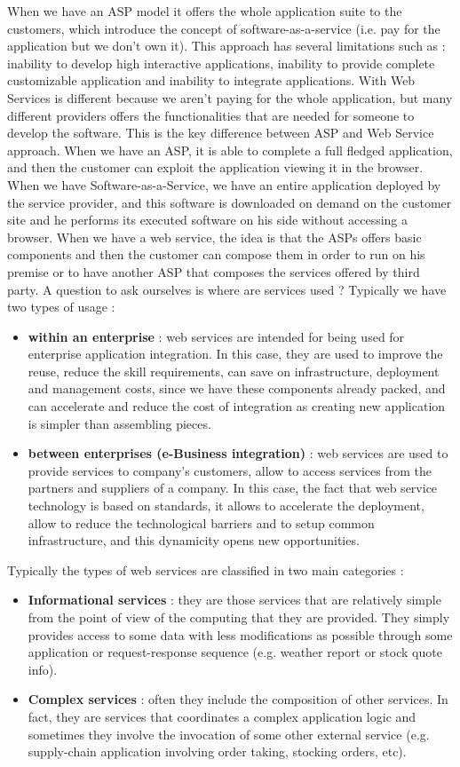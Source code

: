 When we have an ASP model it offers the whole application suite to the customers, which introduce the concept of software-as-a-service (i.e. pay for the application but we don't own it). This approach has several limitations such as : inability to develop high interactive applications, inability to provide complete customizable application and inability to integrate applications. With Web Services is different because we aren't paying for the whole application, but many different providers offers the functionalities that are needed for someone to develop the software. This is the key difference between ASP and Web Service approach. When we have an ASP, it is able to complete a full fledged application, and then the customer can exploit the application viewing it in the browser. When we have Software-as-a-Service, we have an entire application deployed by the service provider, and this software is downloaded on demand on the customer site and he performs its executed software on his side without accessing a browser. When we have a web service, the idea is that the ASPs offers basic components and then the customer can compose them in order to run on his premise or to have another ASP that composes the services offered by third party. A question to ask ourselves is where are services used ? Typically we have two types of usage :
\begin{itemize}
    \item \textbf{within an enterprise} : web services are intended for being used for enterprise application integration. In this case, they are used to improve the reuse, reduce the skill requirements, can save on infrastructure, deployment and management costs, since we have these components already packed, and can accelerate and reduce the cost of integration as creating new application is simpler than assembling pieces.
    \item \textbf{between enterprises (e-Business integration)} : web services are used to provide services to company's customers, allow to access services from the partners and suppliers of a company. In this case, the fact that web service technology is based on standards, it allows to accelerate the deployment, allow to reduce the technological barriers and to setup common infrastructure, and this dynamicity opens new opportunities.
\end{itemize}
Typically the types of web services are classified in two main categories :
\begin{itemize}
    \item \textbf{Informational services} : they are those services that are relatively simple from the point of view of the computing that they are provided. They simply provides access to some data with less modifications as possible through some application or request-response sequence (e.g. weather report or stock quote info).
    \item \textbf{Complex services} : often they include the composition of other services. In fact, they are services that coordinates a complex application logic and sometimes they involve the invocation of some other external service (e.g. supply-chain application involving order taking, stocking orders, etc).
\end{itemize}
